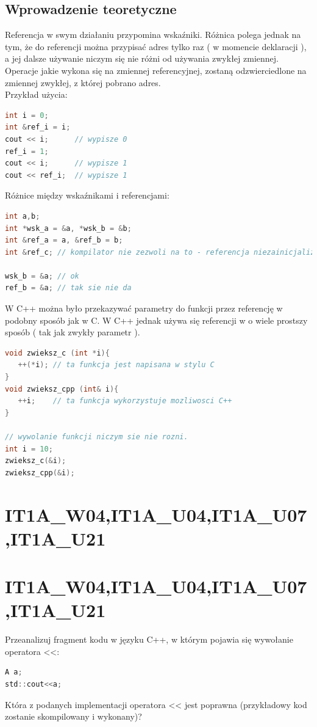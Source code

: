 \subsection{Wprowadzenie teoretyczne}
Referencja w swym działaniu przypomina wskaźniki. Różnica polega jednak na tym, że do referencji można przypisać adres tylko raz ( w momencie deklaracji ), a jej dalsze używanie niczym się nie różni od używania zwykłej zmiennej. Operacje jakie wykona się na zmiennej referencyjnej, zostaną odzwierciedlone na zmiennej zwykłej, z której pobrano adres.\\
Przykład użycia:
\begin{lstlisting}[language=c]
int i = 0;
int &ref_i = i;
cout << i;      // wypisze 0
ref_i = 1;
cout << i;      // wypisze 1
cout << ref_i;  // wypisze 1
\end{lstlisting}
Różnice między wskaźnikami i referencjami:
\begin{lstlisting}[language=c]
int a,b;
int *wsk_a = &a, *wsk_b = &b;
int &ref_a = a, &ref_b = b;
int &ref_c; // kompilator nie zezwoli na to - referencja niezainicjalizowana

wsk_b = &a; // ok
ref_b = &a; // tak sie nie da
\end{lstlisting}
W C++ można było przekazywać parametry do funkcji przez referencję w podobny sposób jak w C. W C++ jednak używa się referencji w o wiele prostszy sposób ( tak jak zwykły parametr ).

\begin{lstlisting}[language=c]
void zwieksz_c (int *i){
   ++(*i); // ta funkcja jest napisana w stylu C
}
void zwieksz_cpp (int& i){
   ++i;    // ta funkcja wykorzystuje mozliwosci C++
}

// wywolanie funkcji niczym sie nie rozni.
int i = 10;
zwieksz_c(&i);
zwieksz_cpp(&i);
\end{lstlisting}

\section{IT1A\_W04,IT1A\_U04,IT1A\_U07,IT1A\_U21} 

\section{IT1A\_W04,IT1A\_U04,IT1A\_U07,IT1A\_U21} 
Przeanalizuj fragment kodu w języku C++, w którym pojawia się wywołanie operatora <<:
\begin{lstlisting}[language=c]
A a;
std::cout<<a;
\end{lstlisting}
Która z podanych implementacji operatora << jest poprawna (przykładowy kod zostanie skompilowany i wykonany)?

